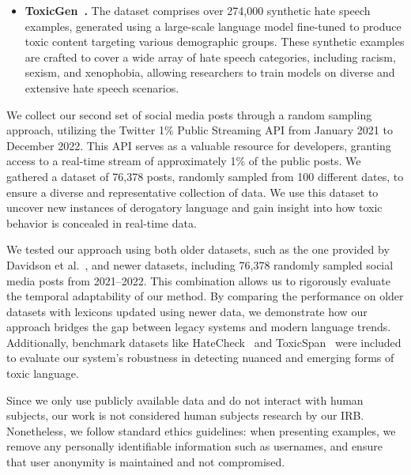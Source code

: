 \begin{itemize}
    \item \textbf{ToxicGen~\cite{hartvigsen-etal-2022-toxigen}.} The dataset comprises over 274,000 synthetic hate speech examples, generated using a large-scale language model fine-tuned to produce toxic content targeting various demographic groups. These synthetic examples are crafted to cover a wide array of hate speech categories, including racism, sexism, and xenophobia, allowing researchers to train models on diverse and extensive hate speech scenarios. 
    
\end{itemize}


We collect our second set of social media posts through a random sampling approach, utilizing the Twitter 1\% Public Streaming API from January 2021 to December 2022.
This API serves as a valuable resource for developers, granting access to a real-time stream of approximately 1\% of the public posts.
We gathered a dataset of 76,378 posts, randomly sampled from 100 different dates, to ensure a diverse and representative collection of data.
We use this dataset to uncover new instances of derogatory language and gain insight into how toxic behavior is concealed in real-time data.

We tested our approach using both older datasets, such as the one provided by Davidson et al.~\cite{davidson2017automated}, and newer datasets, including 76,378 randomly sampled social media posts from 2021–2022. This combination allows us to rigorously evaluate the temporal adaptability of our method. By comparing the performance on older datasets with lexicons updated using newer data, we demonstrate how our approach bridges the gap between legacy systems and modern language trends. Additionally, benchmark datasets like HateCheck~\cite{rottger-etal-2021-hatecheck} and ToxicSpan~\cite{pavlopoulos-etal-2022-acl} were included to evaluate our system’s robustness in detecting nuanced and emerging forms of toxic language.

 Since we only use publicly available data and do not interact with human subjects, our work is not considered human subjects research by our IRB.
Nonetheless, we follow standard ethics guidelines: when presenting examples, we remove any personally identifiable information such as usernames, and ensure that user anonymity is maintained and not compromised.